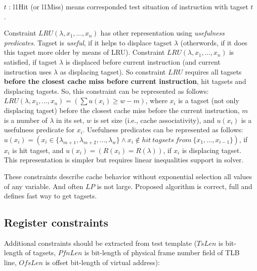 \documentclass[times, 10pt,twocolumn]{article}
\begin{document}
$t$ : l1Hit (or l1Miss) means corresponded test situation of instruction with tagset $t$.

Constraint $LRU(\lambda, x_1, ..., x_n)$ has other representation using \emph{usefulness predicates}. Tagset is \emph{useful}, if it helps to displace tagset $\lambda$ (otherwords, if it does this tagset more older by means of LRU). Constraint $LRU(\lambda, x_1, ..., x_n)$ is satisfied, if tagset $\lambda$ is displaced before current instruction (and current instruction uses $\lambda$ as displacing tagset). So constraint $LRU$ requires all tagsets \textbf{before the closest cache miss before current instruction}, hit tagsets and displacing tagsets. So, this constraint can be represented as follows:
$LRU(\lambda, x_1, ..., x_n) = (\sum u(x_i) \geqslant w-m)$, where $x_i$ is a tagset (not only displacing tagset) before the closest cache miss before the current instruction, $m$ is a number of $\lambda$ in its set, $w$ is set size (i.e., cache associativity), and $u(x_i)$ is a usefulness predicate for $x_i$. Usefulness predicates can be represented as follows: $u(x_i) = (x_i \in \{ \lambda_{m+1}, \lambda_{m+2}, ..., \lambda_w \} \wedge x_i \notin hit~tagsets~from~\{x_1, ..., x_{i-1} \})$, if $x_i$ is hit tagset, and $u(x_i) = (R(x_i) = R(\lambda))$, if $x_i$ is displacing tagset. This representation is simpler but requires linear inequalities support in solver.

These constraints describe cache behavior without exponential selection all values of any variable. And often $LP$ is not large. Proposed algorithm is correct, full and defines fast way to get tagsets.

\subsection{Register constraints}
Additional constraints should be extracted from test template
($TsLen$ is bit-length of tagsets, $PfnLen$ is bit-length of
physical frame number field of TLB line, $OfsLen$ is offset
bit-length of virtual address):
\end{document}

